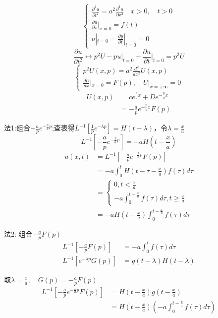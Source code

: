 \begin{ex}[半无界端点外力下的波动方程]
    $$\begin{cases}
        \frac{\partial^{2}u}{\partial t^{2}}=a^{2}\frac{\partial^{2}u}{\partial x^{2}}\quad x>0,\quad t>0\\
        \frac{\partial u}{\partial x}|_{x=0}=f(t)
        \\u|_{t=0}=\frac{\partial y}{\partial t}|_{t=0}=0
        \end{cases}$$
        $$\frac{\partial u}{\partial t^2}\longleftrightarrow p^2U-pu|_{t=0}-\frac{\partial u}{\partial t}\bigg|_{t=0}=p^2U$$
        $$\begin{cases}p^{2}U(x,p)=a^{2}\frac{d^{2}}{dx^{2}}U(x,p)\\\frac{dU}{dx}|_{x=0}=F(p),\quad U|_{x=+\infty}=0\end{cases}$$
        $$\begin{aligned}U(x,p)&=ce^{\frac{p}{a}x}+De^{-\frac{p}{a}x}\\&=-\frac{a}{p}e^{-\frac{p}{a}x}F(p)\end{aligned}$$

\noindent 法1:组合$-\frac{a}{p}e^{-\frac{x}{a}p}$;查表得$L^{-1}[\frac{1}{p}e^{-\lambda p}]=H(t-\lambda)$，令$\lambda=\frac xa$
        $$L^{-1}[-\frac{a}{p}e^{-\frac{x}{a}p}]=-aH(t-\frac{x}{a})$$
        $$\begin{aligned}
            u(x,t)
            &=L^{-1}[-\frac{a}{p}e^{-\frac{x}{a}p}F(p)]\\
            &=-a\int_{0}^{t}H(t-\tau-\frac{x}{a})f(\tau)d\tau\\
            &=\begin{cases}0,t<\frac{x}{a}\\-a\int_{0}^{t-\frac{x}{a}}f(\tau)d\tau,t\geq\frac{x}{a}\end{cases}\\
            &=-aH(t-\frac{x}{a})\int_0^{t-\frac{x}{a}}f(\tau)d\tau 
            \end{aligned}$$

\noindent 法2: 组合$-\frac{a}{p}F(p)$
$$\begin{aligned}L^{-1}[-\frac{a}{p}F(p)]&=-a\int_{0}^{t}f(\tau)d\tau\\L^{-1}[e^{-\lambda p}G(p)]&=g(t-\lambda)H(t-\lambda)\end{aligned}$$

取$\lambda=\frac{x}{a},\quad G(p)=-\frac{a}{p}F(p)$
$$\begin{aligned}L^{-1}[-\frac{a}{p}e^{-\frac{x}{a}p}F(p)]&=H(t-\frac{x}{a})g(t-\frac{x}{a})\\&=H(t-\frac{x}{a})(-a\int_{0}^{t-\frac{x}{a}}f(\tau)d\tau)\end{aligned}$$
\end{ex}